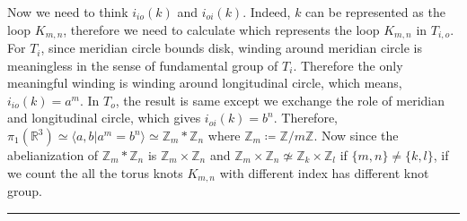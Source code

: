 \begin{exmp}
Now we need to think $i_{io}(k)$ and $i_{oi}(k)$. Indeed, $k$ can be represented as the loop $K_{m,n}$, therefore we need to calculate which represents the loop $K_{m,n}$ in $T_{i,o}$. For $T_i$, since meridian circle bounds disk, winding around meridian circle is meaningless in the sense of fundamental group of $T_i$. Therefore the only meaningful winding is winding around longitudinal circle, which means, $i_{io}(k)=a^m$. In $T_o$, the result is same except we exchange the role of meridian and longitudinal circle, which gives $i_{oi}(k)=b^n$. Therefore, $\pi_1(\mathbb{R}^3)\simeq \langle a,b|a^m=b^n\rangle\simeq \mathbb{Z}_m*\mathbb{Z}_n$ where $\mathbb{Z}_m\coloneqq \mathbb{Z}/m\mathbb{Z}$. Now since the abelianization of $\mathbb{Z}_m*\mathbb{Z}_n$ is $\mathbb{Z}_m\times \mathbb{Z}_n$ and $\mathbb{Z}_m\times \mathbb{Z}_n\not\simeq\mathbb{Z}_k\times \mathbb{Z}_l$ if $\{m,n\}\neq \{k,l\}$, if we count the all the torus knots $K_{m,n}$ with different index has different knot group. 
\end{exmp}

\noindent\rule{\textwidth}{1pt}
\newline